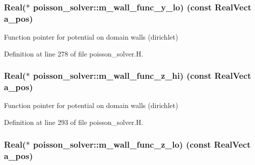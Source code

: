 \subsubsection[{\texorpdfstring{m\+\_\+wall\+\_\+func\+\_\+y\+\_\+lo}{m_wall_func_y_lo}}]{\setlength{\rightskip}{0pt plus 5cm}Real($\ast$ poisson\+\_\+solver\+::m\+\_\+wall\+\_\+func\+\_\+y\+\_\+lo) (const Real\+Vect a\+\_\+pos)\hspace{0.3cm}{\ttfamily [protected]}}\hypertarget{classpoisson__solver_a1e4f53024262b766cc3d0a32d202f49b}{}\label{classpoisson__solver_a1e4f53024262b766cc3d0a32d202f49b}


Function pointer for potential on domain walls (dirichlet) 



Definition at line 278 of file poisson\+\_\+solver.\+H.

\subsubsection[{\texorpdfstring{m\+\_\+wall\+\_\+func\+\_\+z\+\_\+hi}{m_wall_func_z_hi}}]{\setlength{\rightskip}{0pt plus 5cm}Real($\ast$ poisson\+\_\+solver\+::m\+\_\+wall\+\_\+func\+\_\+z\+\_\+hi) (const Real\+Vect a\+\_\+pos)\hspace{0.3cm}{\ttfamily [protected]}}\hypertarget{classpoisson__solver_a397aa517a1927333c65bd99ff8642a46}{}\label{classpoisson__solver_a397aa517a1927333c65bd99ff8642a46}


Function pointer for potential on domain walls (dirichlet) 



Definition at line 293 of file poisson\+\_\+solver.\+H.

\subsubsection[{\texorpdfstring{m\+\_\+wall\+\_\+func\+\_\+z\+\_\+lo}{m_wall_func_z_lo}}]{\setlength{\rightskip}{0pt plus 5cm}Real($\ast$ poisson\+\_\+solver\+::m\+\_\+wall\+\_\+func\+\_\+z\+\_\+lo) (const Real\+Vect a\+\_\+pos)\hspace{0.3cm}{\ttfamily [protected]}}\hypertarget{classpoisson__solver_a7e35d18262538cc083d62f512261bf2d}{}\label{classpoisson__solver_a7e35d18262538cc083d62f512261bf2d}


